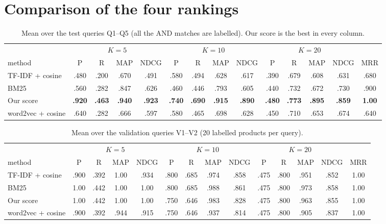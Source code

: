 \documentclass[11pt,a4paper]{article}
\newcommand{\best}[1]{\textbf{#1}}
\begin{document}
\section{Comparison of the four rankings}
\label{sec:compare}

\begin{table}[H]
\centering\footnotesize
\setlength{\tabcolsep}{3.6pt}
\caption{Mean over the test queries Q1--Q5 (all the AND matches are labelled). Our score is the best in every column.}
\label{tab:test}
\begin{tabular}{@{}l cccc cccc cccc c@{}}
\toprule
 & \multicolumn{4}{c}{$K = 5$} & \multicolumn{4}{c}{$K = 10$} & \multicolumn{4}{c}{$K = 20$} & \\
\cmidrule(lr){2-5}\cmidrule(lr){6-9}\cmidrule(lr){10-13}
method & P & R & MAP & NDCG & P & R & MAP & NDCG & P & R & MAP & NDCG & MRR\\
\midrule
TF-IDF + cosine & .480 & .200 & .670 & .491 & .580 & .494 & .628 & .617 & .390 & .679 & .608 & .631 & .680\\
BM25 & .560 & .282 & .847 & .626 & .460 & .446 & .793 & .605 & .440 & .732 & .672 & .730 & .900\\
Our score & \best{.920} & \best{.463} & \best{.940} & \best{.923} & \best{.740} & \best{.690} & \best{.915} &
\best{.890} & \best{.480} & \best{.773} & \best{.895} & \best{.859} & \best{1.00}\\
word2vec + cosine & .640 & .282 & .666 & .597 & .580 & .465 & .698 & .628 & .450 & .710 & .653 & .674 & .640\\
\bottomrule
\end{tabular}
\end{table}

\begin{table}[H]
\centering\footnotesize
\setlength{\tabcolsep}{3.6pt}
\caption{Mean over the validation queries V1--V2 (20 labelled products per query).}
\label{tab:val}
\begin{tabular}{@{}l cccc cccc cccc c@{}}
\toprule
 & \multicolumn{4}{c}{$K = 5$} & \multicolumn{4}{c}{$K = 10$} & \multicolumn{4}{c}{$K = 20$} & \\
\cmidrule(lr){2-5}\cmidrule(lr){6-9}\cmidrule(lr){10-13}
method & P & R & MAP & NDCG & P & R & MAP & NDCG & P & R & MAP & NDCG & MRR\\
\midrule
TF-IDF + cosine & .900 & .392 & 1.00 & .934 & .800 & .685 & .974 & .858 & .475 & .800 & .951 & .852 & 1.00\\
BM25 & 1.00 & .442 & 1.00 & 1.00 & .800 & .685 & .988 & .861 & .475 & .800 & .973 & .858 & 1.00\\
Our score & 1.00 & .442 & 1.00 & 1.00 & .750 & .646 & .983 & .828 & .475 & .800 & .963 & .855 & 1.00\\
word2vec + cosine & .900 & .392 & .944 & .915 & .750 & .646 & .937 & .814 & .475 & .800 & .905 & .837 & 1.00\\
\bottomrule
\end{tabular}
\end{table}
\end{document}
